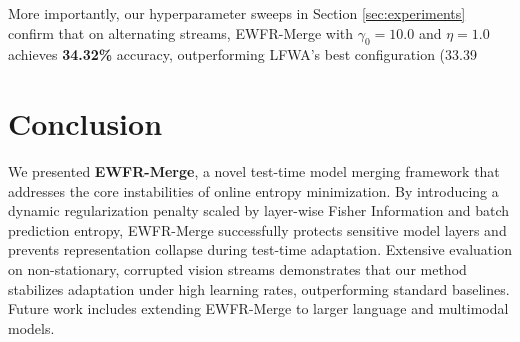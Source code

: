 \documentclass{article}
\theoremstyle{plain}
\theoremstyle{definition}
\theoremstyle{remark}
\begin{document}
More importantly, our hyperparameter sweeps in Section \ref{sec:experiments} confirm that on alternating streams, EWFR-Merge with $\gamma_0 = 10.0$ and $\eta = 1.0$ achieves \textbf{34.32\%} accuracy, outperforming LFWA's best configuration (33.39%

\section{Conclusion}
\label{sec:conclusion}
We presented \textbf{EWFR-Merge}, a novel test-time model merging framework that addresses the core instabilities of online entropy minimization. By introducing a dynamic regularization penalty scaled by layer-wise Fisher Information and batch prediction entropy, EWFR-Merge successfully protects sensitive model layers and prevents representation collapse during test-time adaptation. Extensive evaluation on non-stationary, corrupted vision streams demonstrates that our method stabilizes adaptation under high learning rates, outperforming standard baselines. Future work includes extending EWFR-Merge to larger language and multimodal models.



\end{document}
